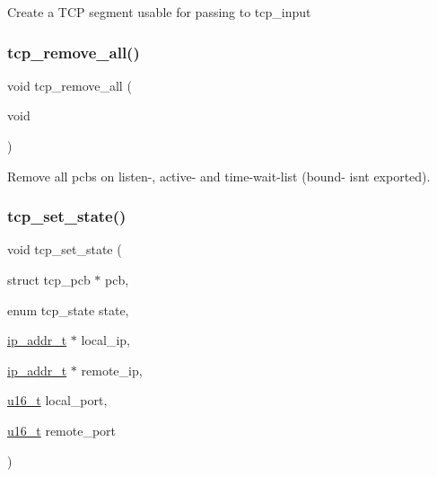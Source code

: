 Create a T\+CP segment usable for passing to tcp\+\_\+input \mbox{\label{openmote-cc2538_2lwip_2test_2unit_2tcp_2tcp__helper_8c_ab5eb6956494f1deb9a97569d4b95ef6a}} 
\subsubsection{\texorpdfstring{tcp\+\_\+remove\+\_\+all()}{tcp\_remove\_all()}}
{\footnotesize\ttfamily void tcp\+\_\+remove\+\_\+all (\begin{DoxyParamCaption}\item[{void}]{ }\end{DoxyParamCaption})}

Remove all pcbs on listen-\/, active-\/ and time-\/wait-\/list (bound-\/ isn\textquotesingle{}t exported). \mbox{\label{openmote-cc2538_2lwip_2test_2unit_2tcp_2tcp__helper_8c_a39f3f73a5ac75fb0de5253cc0a1da423}} 
\subsubsection{\texorpdfstring{tcp\+\_\+set\+\_\+state()}{tcp\_set\_state()}}
{\footnotesize\ttfamily void tcp\+\_\+set\+\_\+state (\begin{DoxyParamCaption}\item[{struct tcp\+\_\+pcb $\ast$}]{pcb,  }\item[{enum tcp\+\_\+state}]{state,  }\item[{\hyperlink{native_2lwip_2src_2include_2lwip_2ip__addr_8h_a88b43639738c4de2d3cd22e3a1fd7696}{ip\+\_\+addr\+\_\+t} $\ast$}]{local\+\_\+ip,  }\item[{\hyperlink{native_2lwip_2src_2include_2lwip_2ip__addr_8h_a88b43639738c4de2d3cd22e3a1fd7696}{ip\+\_\+addr\+\_\+t} $\ast$}]{remote\+\_\+ip,  }\item[{\hyperlink{group__compiler__abstraction_ga77570ac4fcab86864fa1916e55676da2}{u16\+\_\+t}}]{local\+\_\+port,  }\item[{\hyperlink{group__compiler__abstraction_ga77570ac4fcab86864fa1916e55676da2}{u16\+\_\+t}}]{remote\+\_\+port }\end{DoxyParamCaption})}

